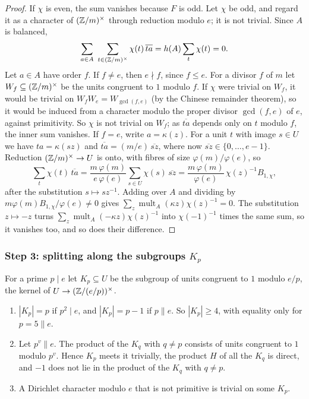 \begin{proof}
If $\chi$ is even, the sum vanishes because $F$ is odd. Let $\chi$ be odd,
and regard it as a character of $(\mathbb{Z}/m)^{\times}$ through reduction modulo
$e$; it is not trivial. Since $A$ is balanced,
\[
  \sum_{a\in A}\ \sum_{t\in(\ZZ/m)^{\times}}\chi(t)\,\overline{ta}
  =h(A)\sum_{t}\chi(t)=0.
\]
Let $a\in A$ have order $f$. If $f\ne e$, then $e\nmid f$, since $f\le e$. For
a divisor $f$ of $m$ let $W_{f}\subseteq(\mathbb{Z}/m)^{\times}$ be the units
congruent to $1$ modulo $f$. If $\chi$ were trivial on $W_{f}$, it would be
trivial on $W_{f}W_{e}=W_{\gcd(f,e)}$ (by the Chinese remainder theorem), so it
would be induced from a character modulo the proper divisor $\gcd(f,e)$ of
$e$, against primitivity. So $\chi$ is not trivial on $W_{f}$; as
$\overline{ta}$ depends only on $t$ modulo $f$, the inner sum vanishes. If
$f=e$, write $a=\kappa(z)$. For a unit $t$ with image $s\in U$ we have
$ta=\kappa(sz)$ and $\overline{ta}=(m/e)\,\overline{sz}$, where now
$\overline{sz}\in\{0,\dots,e-1\}$. Reduction $(\mathbb{Z}/m)^{\times}\to U$ is onto,
with fibres of size $\varphi(m)/\varphi(e)$, so
\[
  \sum_{t}\chi(t)\,\overline{ta}=\frac{m\,\varphi(m)}{e\,\varphi(e)}
  \sum_{s\in U}\chi(s)\,\overline{sz}=\frac{m\,\varphi(m)}{\varphi(e)}\,
  \chi(z)^{-1}B_{1,\chi},
\]
after the substitution $s\mapsto sz^{-1}$. Adding over $A$ and dividing by
$m\varphi(m)B_{1,\chi}/\varphi(e)\ne0$ gives $\sum_{z}\operatorname{mult}_{A}
(\kappa z)\chi(z)^{-1}=0$. The substitution $z\mapsto-z$ turns
$\sum_{z}\operatorname{mult}_{A}(-\kappa z)\chi(z)^{-1}$ into
$\chi(-1)^{-1}$ times the same sum, so it vanishes too, and so does their
difference.
\end{proof}

\subsubsection*{Step 3: splitting along the subgroups \texorpdfstring{$K_{p}$}{K\_p}}
For a prime $p\mid e$ let $K_{p}\subseteq U$ be the subgroup of units
congruent to $1$ modulo $e/p$, the kernel of $U\to(\mathbb{Z}/(e/p))^{\times}$.

\begin{lemma}\label{lem:Kp}
\begin{enumerate}[label=\textup{(\alph*)}]
\item $|K_{p}|=p$ if $p^{2}\mid e$, and $|K_{p}|=p-1$ if $p\parallel e$. So
$|K_{p}|\ge4$, with equality only for $p=5\parallel e$.
\item Let $p^{v}\parallel e$. The product of the $K_{q}$ with $q\ne p$
consists of units congruent to $1$ modulo $p^{v}$. Hence $K_{p}$ meets it
trivially, the product $H$ of all the $K_{q}$ is direct, and $-1$ does not
lie in the product of the $K_{q}$ with $q\ne p$.
\item A Dirichlet character modulo $e$ that is not primitive is trivial on
some $K_{p}$.
\end{enumerate}
\end{lemma}


